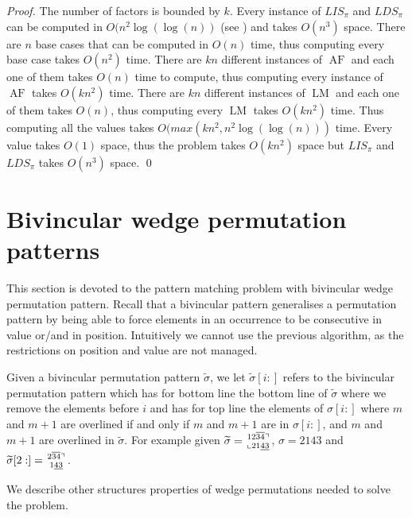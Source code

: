 \documentclass[a4paper]{llncs}
\newcommand{\ptext}{\pi}
\newcommand\BV[2]{\genfrac{}{}{0pt}{}{#1}{#2}}
\newcounter{num}
\DeclareMathOperator{\LMa}{LM}
\DeclareMathOperator{\AFa}{AF}
\begin{document}
\begin{proof}
The number of factors is bounded by $k$.
Every instance of $LIS_{\ptext}$ and $LDS_{\ptext}$ can be computed in $O(n^2\log(\log(n))$ (see \cite{Bespamyatnikh00enumeratinglongest})
and takes $O(n^3)$ space.
There are $n$ base cases that can be computed in $O(n)$ time, thus computing every base case
takes $O(n^2)$ time.
There are $kn$ different instances of $\AFa$ and each one of them takes $O(n)$ time to compute,
thus computing every instance of $\AFa$ takes $O(kn^2)$ time.
There are $kn$ different instances of $\LMa$ and each one of them takes $O(n)$,
thus computing every $\LMa$ takes $O(kn^2)$ time.
Thus computing all the values takes $O(max(kn^2,n^2\log(\log(n)))$ time.
Every value takes $O(1)$ space, thus the problem takes $O(kn^2)$ space
but $LIS_{\ptext}$ and $LDS_{\ptext}$ takes $O(n^3)$ space.
\qed
\end{proof}


\section{Bivincular wedge permutation patterns}
	\label{section:bivincular}

This section is devoted to the pattern matching problem with bivincular wedge permutation pattern.
Recall that a bivincular pattern generalises a permutation pattern by
being able to force elements
in an occurrence
to be consecutive in value or/and in position.
Intuitively we cannot use the previous algorithm, as the restrictions on position and value are not managed.

Given a bivincular permutation pattern $\widetilde{\sigma}$,
we let $\widetilde{\sigma}[i:]$ refers to
the bivincular permutation pattern
which has for bottom line the bottom line of $\widetilde{\sigma}$
where we remove the elements before $i$
and has for top line the elements of $\sigma[i:]$
where $m$ and $m+1$ are overlined if and only if
$m$ and $m+1$ are in $\sigma[i:]$,
and $m$ and $m+1$ are overlined in $\widetilde{\sigma}$.
For example given $\widetilde{\sigma} = \BV{12\overline{34}\urcorner}{\llcorner 21\underline{43}}$,
$\sigma = 2143$ and
$\widetilde{\sigma}[2:] = \BV{2\overline{34}\urcorner}{1\underline{43}}$.

We describe other structures properties of wedge permutations
needed to solve the problem.
\end{document}
